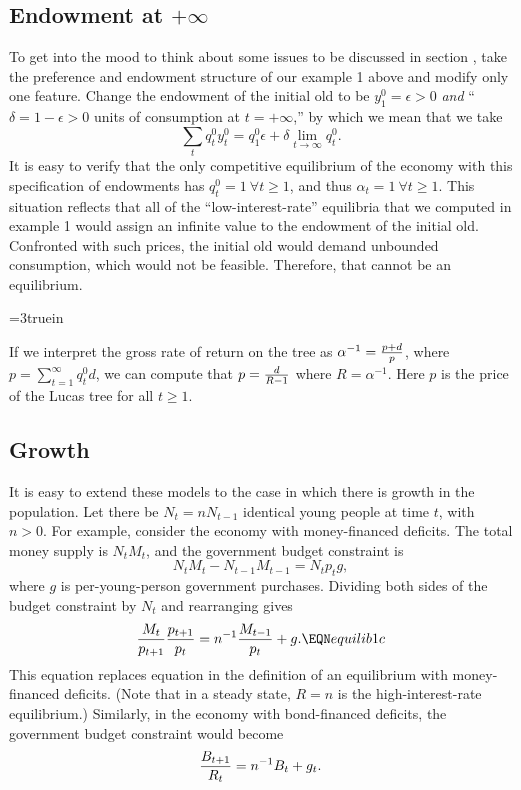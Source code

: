 
\subsection{Endowment at $+\infty$}\label{sec:endowment_infty}%
To get  into the mood to think about some issues to be discussed in
 section , take the preference and endowment structure
of our  example 1 above and modify only one feature. Change the
endowment of the initial old to be  $y^0_1 =\epsilon>0 $ {\it and}
``$\delta=1-\epsilon >0$ units of consumption at $t=+\infty$,''
by which we mean that we take
$$ \sum_t q_t^0 y_t^0 = q_1^0 \epsilon + \delta \lim_{t\rightarrow
   \infty} q_t^0.$$
It is easy to verify that the only competitive equilibrium
of the economy with this specification of endowments
has $q_t^0 = 1 \ \forall t\geq 1$, and thus $\alpha_t = 1
\ \forall t \geq 1$.   This situation reflects that
  all  of the ``low-interest-rate'' equilibria  that we computed in example 1
would assign an infinite value to the endowment
of the initial old.  Confronted with such prices, the
initial old would demand unbounded consumption, which would not be 
feasible.  Therefore, that cannot be an equilibrium.

\centerline{\epsfxsize=3truein}
\caption{Unique equilibrium with a fixed-dividend asset.}
\endfigure

    If we interpret the gross rate of return on the
tree as $\alpha^{-1} = {p + d  \over p}$, where $p = \sum_{t=1}^\infty
q_t^0 d$, we can compute that $p = {d \over R-1}$ where
$R = \alpha^{-1}$.  Here $p$ is the price of the
Lucas tree for all $t \geq 1$.

    

\subsection{Growth}

  It is easy to extend these models to the case  in which  there is
growth in the population.  Let there be $N_t = n N_{t-1}$ identical young
people at time $t$, with $n > 0$.   For example, consider the economy
with money-financed deficits.  The total money supply
is $N_t M_t$, and the government budget constraint is
$$ N_t M_t - N_{t-1} M_{t-1} = N_t p_t g, $$
where $g$ is per-young-person government   purchases.
Dividing both sides of the budget constraint by
$ N_t$ and rearranging gives
$$ {M_t \over p_{t+1}} { p_{t+1} \over p_t} = n^{-1} {M_{t-1} \over p_t}
     + g .\EQN equilib1c  $$
This equation replaces equation  in the definition of
an equilibrium with money-financed deficits.  (Note that
in a steady state, $R=n$ is the high-interest-rate equilibrium.)
Similarly, in the economy with bond-financed deficits,
the government budget constraint would become
$$ {B_{t+1} \over R_t} = n^{-1} B_t + g_t .$$

